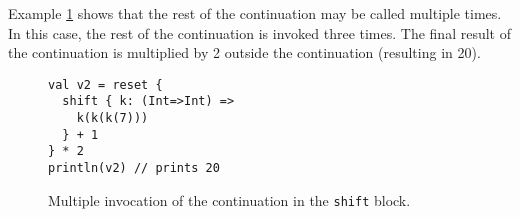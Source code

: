 Example \ref{fig:example_cps_2} shows that the rest of the continuation may be called multiple times. In this case, the rest of the continuation is invoked three times. The final result of the continuation is multiplied by 2 outside the continuation (resulting in 20).

\begin{figure}[h!] \label{fig:example_cps_2}
\begin{lstlisting}
val v2 = reset {
  shift { k: (Int=>Int) =>
    k(k(k(7)))
  } + 1
} * 2
println(v2) // prints 20
\end{lstlisting}
\caption{Multiple invocation of the continuation in the \texttt{shift} block.}
\end{figure}



